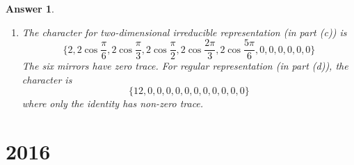 \documentclass[a4paper]{article}
\newtheorem{ans}{Answer}[section]
\theoremstyle{new}
\begin{document}
\begin{ans}
\begin{enumerate}[label=(\alph*)]
$$\begin{pmatrix}
& & & & & & & & & &1 &\\
& & & & & & & & & & &1\\
& & & & & &1 & & & & &\\
\end{pmatrix}$$
$$D(m_4)=\begin{pmatrix}
& & & & & & & & &1& &\\
& & & & & & & &1& & &\\
& & & & & & &1& & & &\\
& & & & & &1& & & & &\\
& & & & & & & & & & &1\\
& & &1& & & & & & & &\\
& & & &1& & & & & & &\\
& & & & &1& & & & & &\\
& & & & & & & & & & &\\
1& & & & & & & & & & &\\
&1& & & & & & & & & &\\
& &1& & & & & & & & &\\
\end{pmatrix}
$$
Since the representations are homomorphisms, we expect, $D(m_4)^{n}=D(m_4^n)=D(m_4^{\mod(n,2)})$ where $m_4$ raised to even power is identity (we have $D(I)=I$) and $m_4$ raised to odd power is $m_4$. 
\item The character for two-dimensional irreducible representation (in part (c)) is
$$\bigg\{2,2\cos\frac{\pi}{6},2\cos\frac{\pi}{3},2\cos\frac{\pi}{2},2\cos\frac{2\pi}{3},2\cos\frac{5\pi}{6},0,0,0,0,0,0\bigg\}$$
The six mirrors have zero trace. For regular representation (in part (d)), the character is
$$\{12,0,0,0,0,0,0,0,0,0,0,0\}$$
where only the identity has non-zero trace.


\end{enumerate}
\end{ans}
\newpage
\section{2016}
\end{document}
